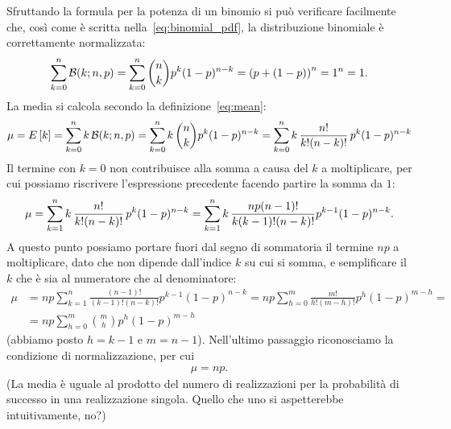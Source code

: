 Sfruttando la formula per la potenza di un binomio si può verificare
facilmente che, così come è scritta nella~\eqref{eq:binomial_pdf}, la
distribuzione binomiale è correttamente normalizzata:
\begin{align*}
  \sum_{k=0}^n \binomialpdf[n, p]{k} = \sum_{k=0}^n \binom{n}{k}p^k (1 - p)^{n-k} =
  \left(p + (1 - p)\right)^n = 1^n = 1.
\end{align*}
La media si calcola secondo la definizione~\eqref{eq:mean}:
\begin{align*}
  \mu = \expect{k} = \sum_{k=0}^n k\,\binomialpdf[n, p]{k} =
  \sum_{k=0}^n k\,\binom{n}{k}p^k (1 - p)^{n-k} =
  \sum_{k=0}^n k\, \binomexpr{n}{k} \, p^k (1 - p)^{n-k}
\end{align*}
Il termine con $k = 0$ non contribuisce alla somma a causa del $k$
a moltiplicare, per cui possiamo riscrivere l'espressione precedente
facendo partire la somma da $1$:
\begin{align*}
  \mu = \sum_{k=1}^n k\,\frac{n!}{k!(n - k)!} \, p^k (1 - p)^{n-k} =
  \sum_{k=1}^n k\,\frac{np(n -1)!}{k(k - 1)!(n - k)!} p^{k-1} (1 - p)^{n - k}.
\end{align*}
A questo punto possiamo portare fuori dal segno di sommatoria il termine $np$ a
moltiplicare, dato che non dipende dall'indice $k$ su cui si somma, e
semplificare il $k$ che è sia al numeratore che al denominatore:
\begin{align*}
  \mu & =
  np \sum_{k=1}^n \frac{(n - 1)!}{(k - 1)!(n - k)!} p^{k - 1} (1 - p)^{n - k} =
  np \sum_{h=0}^m \frac{m!}{h!(m - h)!} p^h (1 - p)^{m - h} =\\
  & = np \sum_{h=0}^m \binom{m}{h} p^h (1 - p)^{m - h}
\end{align*}
(abbiamo posto $h = k - 1$ e $m = n - 1$). Nell'ultimo passaggio riconosciamo
la condizione di normalizzazione, per cui
\begin{align}\label{eq:binomial_mean}
  \mu = np.
\end{align}
(La media è uguale al prodotto del numero di realizzazioni per la
probabilità di successo in una realizzazione singola. Quello che uno si
aspetterebbe intuitivamente, no?)

